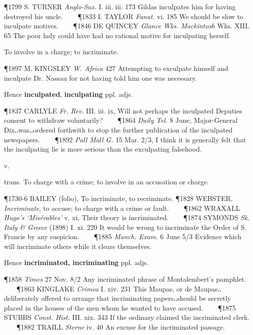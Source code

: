 \begin{description}[wide, labelwidth=!, labelindent=0pt]
\begin{myenumerate}
\P 1799 S. TURNER  \textit{Anglo-Sax.} I. iii. iii. 173 Gildas inculpates him for having destroyed his uncle.    
\P 1833 I. TAYLOR  \textit{Fanat.} vi. 185 We should be slow to inculpate motives.    
\P 1846 DE QUINCEY  \textit{Glance Wks. Mackintosh} Wks. XIII. 65 The poor lady could have had no rational motive for inculpating herself.

 To involve in a charge; to incriminate.

\P 1897 M. KINGSLEY  \textit{W. Africa} 427 Attempting to exculpate himself and inculpate Dr. Nassau for not having told him one was necessary.

\noindent Hence \textbf{inculpated}, \textbf{inculpating} ppl. adjs.

\P 1837 CARLYLE  \textit{Fr. Rev.} III. iii. ix, Will not perhaps the inculpated Deputies consent to withdraw voluntarily?    
\P 1864  \textit{Daily Tel.} 8 June, Major-General Dix‥was‥ordered forthwith to stop the further publication of the inculpated newspapers.    
\P 1892  \textit{Pall Mall G.} 15 Mar. 2/3, I think it is generally felt that the inculpating lie is more serious than the exculpating falsehood.
\end{myenumerate}


 v.

\noindent {}


\noindent trans. To charge with a crime; to involve in an accusation or charge.

\P 1730-6 BAILEY (folio), To incriminate, to recriminate.
\P 1828 WEBSTER,  \textit{Incriminate}, to accuse; to charge with a crime or fault.    
\P 1862 WRAXALL  \textit{Hugo's ‘Misérables’} v. xi, Their theory is incriminated.    
\P 1874 SYMONDS  \textit{Sk. Italy \& Greece} (1898) I. xi. 220 It would be wrong to incriminate the Order of S. Francis by any suspicion.    
\P 1885 \textit{Manch.  Exam.} 6 June 5/3 Evidence which will incriminate others while it clears themselves.

\noindent Hence \textbf{incriminated, incriminating} ppl. adjs.

\P 1858  \textit{Times} 27 Nov. 8/2 Any incriminated phrase of Montalembert's pamphlet.    
\P 1863 KINGLAKE  \textit{Crimea} I. xiv. 231 This Maupas, or de Maupas‥deliberately offered to arrange that incriminating papers‥should be secretly placed in the houses of the men whom he wanted to have accused.    
\P 1875 STUBBS  \textit{Const. Hist.} III. xix. 343 If the ordinary claimed the incriminated clerk.    
\P 1882 TRAILL  \textit{Sterne} iv. 40 An excuse for the incriminated passage.



\end{description}

